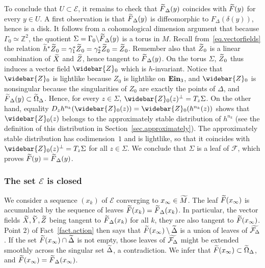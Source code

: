 \documentclass[11pt]{article}
\theoremstyle{definition}
\numberwithin{equation}{section}
\numberwithin{figure}{section}
\numberwithin{table}{section}
\DeclareMathOperator{\ein}{{\bf Ein}_3}
\newcommand{\calf}{\mathcal{F}}
\newcommand{\tm}{\tilde{{M}}}
\newcommand{\tX}{\tilde{{X}}}
\newcommand{\tY}{\tilde{{Y}}}
\newcommand{\tZ}{\tilde{{Z}}}
\newcommand{\tFd}{\tilde{{F}}_{\Delta}}
\newcommand{\tF}{\tilde{{F}}}
\newcommand{\tth}{\tilde{h}}
\newcommand{\tcalfd}{\tilde{{\mathcal{F}_{\Delta}}}}
\newcommand*\ZZ{\mathbb{Z}}
\let\oldtilde\tilde
\renewcommand*\tilde[1]{\mathchoice{\widetilde{#1}}{\widetilde{#1}}{\widetilde{#1}}{\oldtilde{#1}}}
\let\oldbar\bar
\renewcommand*{\bar}[1]{\mathchoice{\widebar{#1}}{\widebar{#1}}{\oldbar{#1}}{\oldbar{#1}}}
\renewcommand*{\overline}{\bar}
\begin{document}
To conclude that $U \subset {\mathcal E}$, it remains to check that $\tFd(y)$ coincides with $\tF(y)$ for every $y \in U$. A first observation is that $\tFd(y)$ is diffeomorphic to $F_{\Delta}(\delta(y))$, hence is a disk. It follows from a cohomological dimension argument that because $\Gamma_{0} \simeq \ZZ^2$, the quotient $\Sigma=\Gamma_{0} \backslash
\tFd(y)$ is a torus in $M$. Recall from~\eqref{eq.vectorfields} the relation $\tth^*\tZ_0=\gamma_1^*\tZ_0=\gamma_2^* \tZ_0=\tZ_0$. Remember also that $\tZ_0$ is a linear combination of $\tX$ and $\tZ$, hence tangent to $\tFd(y)$. On the torus $\Sigma$, $\tZ_0$ thus induces a vector field $\overline{Z}_0$ which is $h$-invariant. Notice that $\overline{Z}_0$ is lightlike because $Z_0$ is lightlike on $\ein$, and $\overline{Z}_0$ is nonsingular because the singularities of $Z_0$ are exactly the points of $\Delta$, and $\tFd(y) \subset \tilde{\Omega}_{\Delta}$. Hence, for every $z \in \Sigma$, $\overline{Z}_0(z)^{\perp}=T_z \Sigma$. On the other hand, equality $D_zh^{n_k}(\overline{Z}_0(z))=\overline{Z}_0(h^{n_k}(z))$ shows that $\overline{Z}_0(z)$ belongs to the approximately stable distribution of $h^{n_k}$ (see the definition of this distribution in Section~\ref{sec.approximately}). The approximately stable distribution has codimension~$1$ and is lightlike, so that it coincides with $\overline{Z}_0(z)^{\perp}=T_z\Sigma$ for all $z \in \Sigma$. We conclude that $\Sigma$ is a leaf of $\calf$, which proves $\tF(y)=\tFd(y)$.



\subsubsection{The set \texorpdfstring{$\mathcal{E}$}{E} is closed}\label{sec.closed}
We consider a sequence $(x_k)$ of ${\mathcal E}$ converging to $x_{\infty} \in \tm$. The leaf $\tF(x_{\infty})$ is accumulated by the sequence of leaves $\tF(x_k)=\tF_{\Delta}(x_k)$. In particular, the vector fields $\tX,\tY,\tZ$ being tangent to $\tF_{\Delta}(x_k)$ for all $k$, they are also tangent to $\tF(x_{\infty})$. Point $2)$ of Fact~\ref{fact.action} then says that $\tF(x_{\infty}) \setminus \tilde{\Delta}$ is a union of leaves of $\tcalfd$. If the set $\tF(x_{\infty}) \cap \tilde{\Delta}$ is not empty, those leaves of $\tcalfd$ might be extended smoothly across the singular set $\tilde{\Delta}$, a contradiction. We infer that $\tF(x_{\infty}) \subset \tilde{\Omega}_{\Delta}$, and $\tF(x_{\infty})=\tF_{\Delta}(x_{\infty})$.
\end{document}
